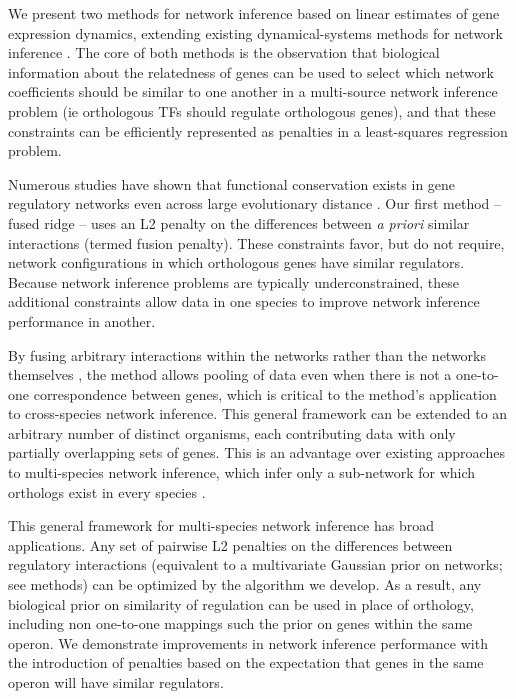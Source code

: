 \documentclass[11pt]{article}
\begin{document}
We present two methods for network inference based on linear estimates of gene expression dynamics, extending existing dynamical-systems methods for network inference \cite{bonneau_predictive_2007, arrieta-ortiz_experimentally_2015, yeung_reverse_2002}. The core of both methods is the observation that biological information about the relatedness of genes can be used to select which network coefficients should be similar to one another in a multi-source network inference problem (ie orthologous TFs should regulate orthologous genes), and that these constraints can be efficiently represented as penalties in a least-squares regression problem. 

Numerous studies have shown that functional conservation exists in gene regulatory networks even across large evolutionary distance \cite{satou2006gene, hinman2009evolution,tanay2005conservation,erwin2009evolution}. Our first method -- fused ridge -- uses an L2 penalty on the differences between \textit{a priori} similar interactions (termed fusion penalty). These constraints favor, but do not require, network configurations in which orthologous genes have similar regulators. Because network inference problems are typically underconstrained, these additional constraints allow data in one species to improve network inference performance in another.

By fusing arbitrary interactions within the networks rather than the networks themselves \cite{}, the method allows pooling of data even when there is not a one-to-one correspondence between genes, which is critical to the method's application to cross-species network inference. This general framework can be extended to an arbitrary number of distinct organisms, each contributing data with only partially overlapping sets of genes. This is an advantage over existing approaches to multi-species network inference, which infer only a sub-network for which orthologs exist in every species \cite{joshi_multi-species_2015}. 

This general framework for multi-species network inference has broad applications. Any set of pairwise L2 penalties on the differences between regulatory interactions (equivalent to a multivariate Gaussian prior on networks; see methods) can be optimized by the algorithm we develop. As a result, any biological prior on similarity of regulation can be used in place of orthology, including non one-to-one mappings such the prior on genes within the same operon. We demonstrate improvements in network inference performance with the introduction of penalties based on the expectation that genes in the same operon will have similar regulators.
\end{document}
